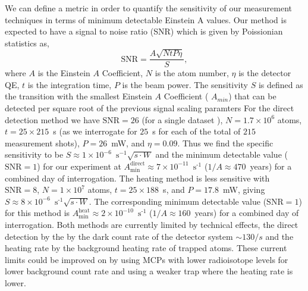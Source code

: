 \documentclass[%
 amsmath,amssymb,
aps,
]{revtex4-2}
\newcommand{\TODO}[1]{{\color{red}\textbf{TODO: }{#1}\normalcolor}} %
\newcommand{\com}[1]{{\color{blue}[{#1}]\normalcolor}} %
\begin{document}
We can define a metric in order to quantify the sensitivity of our measurement techniques in terms of minimum detectable Einstein A values. Our method is expected to have a signal to noise ratio (SNR) which is given by Poissionian statistics as,
\begin{equation}
    \mathrm{SNR}= \frac{A \sqrt{N t P \eta }}{S}  ,
\end{equation}
where $A$ is the Einstein \(A\) Coefficient, $N$ is the atom number, $\eta$ is the detector QE, $t$ is the integration time, $P$ is the beam power. The sensitivity $S$ is defined as the transition with the smallest Einstein \(A\) Coefficient ( \(A_{min}\)) that can be detected per square root of the previous signal scaling paramters
For the direct detection method we have \(\mathrm{SNR} = 26\) (for a single dataset ), \(N=1.7\times 10^6\) atoms, \(t=25\times215\)~s (as we interrogate for \(25\)~s for each of the total of \(215\) measurement shots), \(P=26\)~mW, and $\eta=0.09$. 
Thus we find the specific sensitivity to be \(S\approx 1\times10^{-6}\)~\(\text{s}^{-1} \sqrt{s\cdot W}\) and the minimum detectable value ($\mathrm{SNR}=1$) for our experiment at \(A_{\mathrm{min}}^{\mathrm{direct}} \approx 7 \times10^{-11}\)~\(\text{s}^{\text{-}1}\) (\(1/A \approx 470\)~years)  for a combined day of interrogation. 
The heating method is less sensitive with \(\mathrm{SNR} = 8\),  \(N=1\times 10^7\) atoms, \(t=25\times188\)~s, and
\(P=17.8\)~mW, giving \(S\approx 8\times10^{-6}\)~\(\text{s}^{\text{-}1} \sqrt{s\cdot W}\). The corresponding minimum detectable value ($\mathrm{SNR}=1$) for this method is \(A_{\mathrm{min}}^{\mathrm{heat}} \approx 2 \times10^{-10}\)~\(\text{s}^{\text{-}1}\) (\(1/A \approx 160\)~years) for a combined day of interrogation. 
Both methods are currently limited by technical effects, the direct detection by the by the dark count rate of the detector system \(\sim130/s\) and the heating rate by the background heating rate of trapped atoms. These current limits could be improved on by using MCPs with lower radioisotope levels for lower background count rate and using a weaker trap where the heating rate is lower. 


\end{document}
